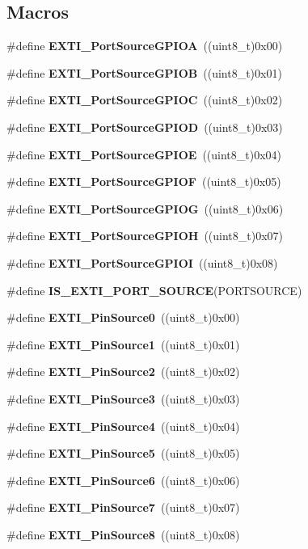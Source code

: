 \subsection*{Macros}
\begin{DoxyCompactItemize}
\item 
\#define \textbf{ E\+X\+T\+I\+\_\+\+Port\+Source\+G\+P\+I\+OA}~((uint8\+\_\+t)0x00)
\item 
\#define \textbf{ E\+X\+T\+I\+\_\+\+Port\+Source\+G\+P\+I\+OB}~((uint8\+\_\+t)0x01)
\item 
\#define \textbf{ E\+X\+T\+I\+\_\+\+Port\+Source\+G\+P\+I\+OC}~((uint8\+\_\+t)0x02)
\item 
\#define \textbf{ E\+X\+T\+I\+\_\+\+Port\+Source\+G\+P\+I\+OD}~((uint8\+\_\+t)0x03)
\item 
\#define \textbf{ E\+X\+T\+I\+\_\+\+Port\+Source\+G\+P\+I\+OE}~((uint8\+\_\+t)0x04)
\item 
\#define \textbf{ E\+X\+T\+I\+\_\+\+Port\+Source\+G\+P\+I\+OF}~((uint8\+\_\+t)0x05)
\item 
\#define \textbf{ E\+X\+T\+I\+\_\+\+Port\+Source\+G\+P\+I\+OG}~((uint8\+\_\+t)0x06)
\item 
\#define \textbf{ E\+X\+T\+I\+\_\+\+Port\+Source\+G\+P\+I\+OH}~((uint8\+\_\+t)0x07)
\item 
\#define \textbf{ E\+X\+T\+I\+\_\+\+Port\+Source\+G\+P\+I\+OI}~((uint8\+\_\+t)0x08)
\item 
\#define \textbf{ I\+S\+\_\+\+E\+X\+T\+I\+\_\+\+P\+O\+R\+T\+\_\+\+S\+O\+U\+R\+CE}(P\+O\+R\+T\+S\+O\+U\+R\+CE)
\item 
\#define \textbf{ E\+X\+T\+I\+\_\+\+Pin\+Source0}~((uint8\+\_\+t)0x00)
\item 
\#define \textbf{ E\+X\+T\+I\+\_\+\+Pin\+Source1}~((uint8\+\_\+t)0x01)
\item 
\#define \textbf{ E\+X\+T\+I\+\_\+\+Pin\+Source2}~((uint8\+\_\+t)0x02)
\item 
\#define \textbf{ E\+X\+T\+I\+\_\+\+Pin\+Source3}~((uint8\+\_\+t)0x03)
\item 
\#define \textbf{ E\+X\+T\+I\+\_\+\+Pin\+Source4}~((uint8\+\_\+t)0x04)
\item 
\#define \textbf{ E\+X\+T\+I\+\_\+\+Pin\+Source5}~((uint8\+\_\+t)0x05)
\item 
\#define \textbf{ E\+X\+T\+I\+\_\+\+Pin\+Source6}~((uint8\+\_\+t)0x06)
\item 
\#define \textbf{ E\+X\+T\+I\+\_\+\+Pin\+Source7}~((uint8\+\_\+t)0x07)
\item 
\#define \textbf{ E\+X\+T\+I\+\_\+\+Pin\+Source8}~((uint8\+\_\+t)0x08)

\end{DoxyCompactItemize}
